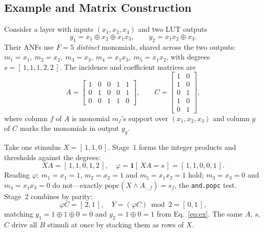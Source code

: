 \documentclass[sigconf]{acmart}
\newcommand{\mmapopc}{\texttt{and.popc}}
\begin{document}
\subsection{Example and Matrix Construction}
Consider a layer with inputs $(x_1,x_2,x_3)$ and two LUT outputs
\begin{equation}
y_1 = x_1 \oplus x_2 \oplus x_1 x_3, \qquad
y_2 = x_1 x_2 \oplus x_3 .
\label{eq:ex}
\end{equation}
Their ANFs use $F{=}5$ \emph{distinct} monomials, shared across the two outputs:
$m_1{=}x_1,\ m_2{=}x_2,\ m_3{=}x_3,\ m_4{=}x_1x_3,\ m_5{=}x_1x_2$, with degrees
$s=[\,1,1,1,2,2\,]$. The incidence and coefficient matrices are
\begin{equation}
A=\begin{bmatrix}
1&0&0&1&1\\
0&1&0&0&1\\
0&0&1&1&0
\end{bmatrix},
\qquad
C=\begin{bmatrix}
1&0\\
1&0\\
0&1\\
1&0\\
0&1
\end{bmatrix},
\label{eq:exAC}
\end{equation}
where column $f$ of $A$ is monomial $m_f$'s support over $(x_1,x_2,x_3)$ and column $g$ of $C$
marks the monomials in output $y_g$.

Take one stimulus $X=[\,1,1,0\,]$. Stage~1 forms the integer products and thresholds against the
degrees:
\begin{equation}
XA=[\,1,1,0,1,2\,],\quad
\varphi=\mathbf{1}[\,XA=s\,]=[\,1,1,0,0,1\,].
\label{eq:exphi}
\end{equation}
Reading $\varphi$: $m_1{=}x_1{=}1$, $m_2{=}x_2{=}1$ and $m_5{=}x_1x_2{=}1$ hold; $m_3{=}x_3{=}0$
and $m_4{=}x_1x_3{=}0$ do not---exactly $\mathrm{popc}(X\wedge A_{:,f})=s_f$, the \mmapopc{}
test. Stage~2 combines by parity:
\begin{equation}
\varphi C=[\,2,1\,],\quad
Y=(\varphi C)\bmod 2=[\,0,1\,],
\label{eq:exY}
\end{equation}
matching $y_1=1{\oplus}1{\oplus}0=0$ and $y_2=1{\oplus}0=1$ from Eq.~\eqref{eq:ex}. The same $A$,
$s$, $C$ drive all $B$ stimuli at once by stacking them as rows of $X$.
\end{document}
